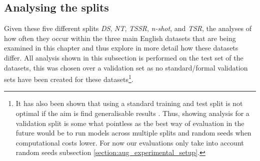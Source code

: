 \subsection{Analysing the splits}
\label{section:aug_analysing_the_splits}
Given these five different splits \textit{DS}, \textit{NT}, \textit{TSSR}, \textit{n-shot}, and \textit{TSR}, the analyses of how often they occur within the three main English datasets that are being examined in this chapter and thus explore in more detail how these datasets differ. All analysis shown in this subsection is performed on the test set of the datasets, this was chosen over a validation set as no standard/formal validation sets have been created for these datasets\footnote{It has also been shown that using a standard training and test split is not optimal if the aim is find generalisable results \citep{gorman-bedrick-2019-need,moss-etal-2019-fiesta}. Thus, showing analysis for a validation split is some what pointless as the best way of evaluation in the future would be to run models across multiple splits and random seeds \citep{moss-etal-2019-fiesta} when computational costs lower. For now our evaluations only take into account random seeds subsection \ref{section:aug_experimental_setup}.}.

